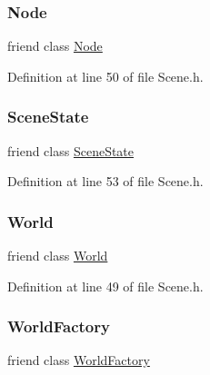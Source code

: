 \subsubsection{\texorpdfstring{Node}{Node}}
{\footnotesize\ttfamily friend class \mbox{\hyperlink{classnjli_1_1_node}{Node}}\hspace{0.3cm}{\ttfamily [friend]}}



Definition at line 50 of file Scene.\+h.

\mbox{\label{classnjli_1_1_scene_ace13a6b81a7cce08dd6f9d0c1c00af04}} 
\subsubsection{\texorpdfstring{Scene\+State}{SceneState}}
{\footnotesize\ttfamily friend class \mbox{\hyperlink{classnjli_1_1_scene_state}{Scene\+State}}\hspace{0.3cm}{\ttfamily [friend]}}



Definition at line 53 of file Scene.\+h.

\mbox{\label{classnjli_1_1_scene_a7b4bcdf992c21ae83363f25df05b1d25}} 
\subsubsection{\texorpdfstring{World}{World}}
{\footnotesize\ttfamily friend class \mbox{\hyperlink{classnjli_1_1_world}{World}}\hspace{0.3cm}{\ttfamily [friend]}}



Definition at line 49 of file Scene.\+h.

\mbox{\label{classnjli_1_1_scene_acb96ebb09abe8f2a37a915a842babfac}} 
\subsubsection{\texorpdfstring{World\+Factory}{WorldFactory}}
{\footnotesize\ttfamily friend class \mbox{\hyperlink{classnjli_1_1_world_factory}{World\+Factory}}\hspace{0.3cm}{\ttfamily [friend]}}



